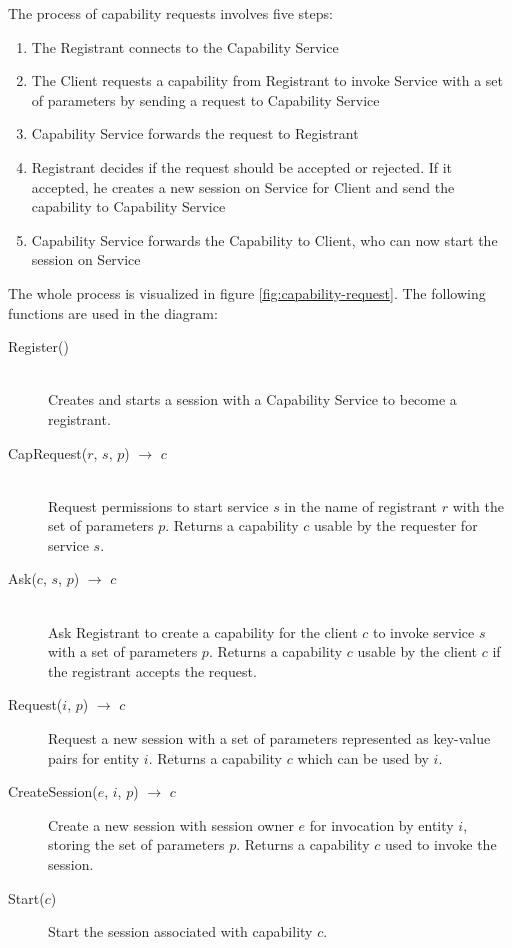 The process of capability requests involves five steps:
\begin{enumerate}
    \item The Registrant connects to the Capability Service
    \item The Client requests a capability from Registrant to invoke Service with a set of parameters by sending a request to Capability Service
    \item Capability Service forwards the request to Registrant
    \item Registrant decides if the request should be accepted or rejected.
        If it accepted, he creates a new session on Service for Client and send the capability to Capability Service
    \item Capability Service forwards the Capability to Client, who can now start the session on Service
\end{enumerate}

The whole process is visualized in figure \ref{fig:capability-request}.
The following functions are used in the diagram:
\begin{description}
    \item[Register()]\hfill\\
        Creates and starts a session with a Capability Service to become a registrant.
    \item[CapRequest($r$, $s$, $p$) $\rightarrow$ $c$]\hfill\\
        Request permissions to start service $s$ in the name of registrant $r$ with the set of parameters $p$.
        Returns a capability $c$ usable by the requester for service $s$.
    \item[Ask($c$, $s$, $p$) $\rightarrow$ $c$]\hfill\\
        Ask Registrant to create a capability for the client $c$ to invoke service $s$ with a set of parameters $p$.
        Returns a capability $c$ usable by the client $c$ if the registrant accepts the request.
    \item[Request($i$, $p$) $\rightarrow$ $c$]
        Request a new session with a set of parameters represented as key-value pairs for entity $i$.
        Returns a capability $c$ which can be used by $i$.
    \item[CreateSession($e$, $i$, $p$) $\rightarrow$ $c$]
        Create a new session with session owner $e$ for invocation by entity $i$, storing the set of parameters $p$.
        Returns a capability $c$ used to invoke the session.
    \item[Start($c$)]
        Start the session associated with capability $c$.
\end{description}


